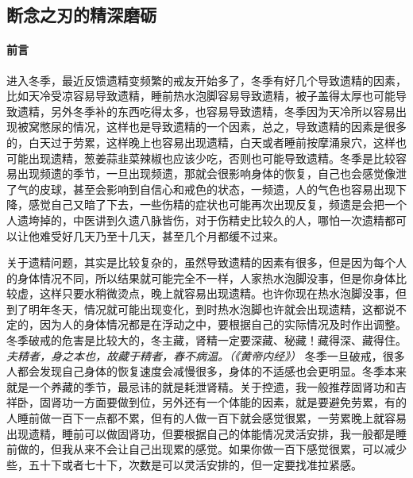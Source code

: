 \subsection{断念之刃的精深磨砺}\label{99}

\paragraph*{前言}

进入冬季，最近反馈遗精变频繁的戒友开始多了，冬季有好几个导致遗精的因素，比如天冷受凉容易导致遗精，睡前热水泡脚容易导致遗精，被子盖得太厚也可能导致遗精，另外冬季补的东西吃得太多，也容易导致遗精，冬季因为天冷所以容易出现被窝憋尿的情况，这样也是导致遗精的一个因素，总之，导致遗精的因素是很多的，白天过于劳累，这样晚上也容易出现遗精，白天或者睡前按摩涌泉穴，这样也可能出现遗精，葱姜蒜韭菜辣椒也应该少吃，否则也可能导致遗精。冬季是比较容易出现频遗的季节，一旦出现频遗，那就会很影响身体的恢复，自己也会感觉像泄了气的皮球，甚至会影响到自信心和戒色的状态，一频遗，人的气色也容易出现下降，感觉自己又暗了下去，一些伤精的症状也可能再次出现反复，频遗是会把一个人遗垮掉的，中医讲到久遗八脉皆伤，对于伤精史比较久的人，哪怕一次遗精都可以让他难受好几天乃至十几天，甚至几个月都缓不过来。

关于遗精问题，其实是比较复杂的，虽然导致遗精的因素有很多，但是因为每个人的身体情况不同，所以结果就可能完全不一样，人家热水泡脚没事，但是你身体比较虚，这样只要水稍微烫点，晚上就容易出现遗精。也许你现在热水泡脚没事，但到了明年冬天，情况就可能出现变化，到时热水泡脚也许就会出现遗精，这都说不定的，因为人的身体情况都是在浮动之中，要根据自己的实际情况及时作出调整。冬季破戒的危害是比较大的，冬主藏，肾精一定要深藏、秘藏！藏得深、藏得住。\textit{夫精者，身之本也，故藏于精者，春不病温。（《黄帝内经》）} 冬季一旦破戒，很多人都会发现自己身体的恢复速度会减慢很多，身体的不适感也会更明显。冬季本来就是一个养藏的季节，最忌讳的就是耗泄肾精。关于控遗，我一般推荐固肾功和吉祥卧，固肾功一方面要做到位，另外还有一个体能的因素，就是要避免劳累，有的人睡前做一百下一点都不累，但有的人做一百下就会感觉很累，一劳累晚上就容易出现遗精，睡前可以做固肾功，但要根据自己的体能情况灵活安排，我一般都是睡前做的，但我从来不会让自己出现累的感觉。如果你做一百下感觉很累，可以减少些，五十下或者七十下，次数是可以灵活安排的，但一定要找准拉紧感。

